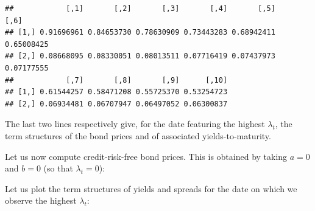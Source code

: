 \documentclass[
  12pt,
]{book}
\newenvironment{Shaded}{\begin{snugshade}}{\end{snugshade}}
\newcommand{\AttributeTok}[1]{\textcolor[rgb]{0.13,0.29,0.53}{#1}}
\newcommand{\DecValTok}[1]{\textcolor[rgb]{0.00,0.00,0.81}{#1}}
\newcommand{\FloatTok}[1]{\textcolor[rgb]{0.00,0.00,0.81}{#1}}
\newcommand{\FunctionTok}[1]{\textcolor[rgb]{0.13,0.29,0.53}{\textbf{#1}}}
\newcommand{\NormalTok}[1]{#1}
\newcommand{\OtherTok}[1]{\textcolor[rgb]{0.56,0.35,0.01}{#1}}
\newcommand{\SpecialCharTok}[1]{\textcolor[rgb]{0.81,0.36,0.00}{\textbf{#1}}}
\theoremstyle{definition}
\theoremstyle{definition}
\theoremstyle{definition}
\theoremstyle{definition}
\theoremstyle{remark}
\begin{document}
\begin{verbatim}
##            [,1]       [,2]       [,3]       [,4]       [,5]       [,6]
## [1,] 0.91696961 0.84653730 0.78630909 0.73443283 0.68942411 0.65008425
## [2,] 0.08668095 0.08330051 0.08013511 0.07716419 0.07437973 0.07177555
##            [,7]       [,8]       [,9]      [,10]
## [1,] 0.61544257 0.58471208 0.55725370 0.53254723
## [2,] 0.06934481 0.06707947 0.06497052 0.06300837
\end{verbatim}

The last two lines respectively give, for the date featuring the highest \(\lambda_t\), the term structures of the bond prices and of associated yields-to-maturity.

Let us now compute credit-risk-free bond prices. This is obtained by taking \(a=0\) and \(b=0\) (so that \(\lambda_t=0\)):

\begin{Shaded}
\end{Shaded}

Let us plot the term structures of yields and spreads for the date on which we observe the highest \(\lambda_t\):
\end{document}
